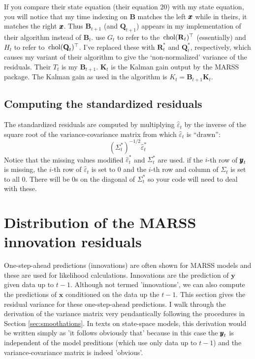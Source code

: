 \documentclass[]{article}
\def\UPS{\mbox{\boldmath $\Upsilon$}}
\def\BB{\mbox{$\mathbf B$}}	\def\bb{\mbox{$\mathbf b$}} \def\Bb{\mbox{$\mathbf J$}} \def\Ba{\mbox{$\mathbf L$}} \def\Bm{\UPS}
\def\KK{\mbox{$\mathbf K$}}
\def\QQ{\mbox{$\mathbf Q$}}	 \def\qq{\mbox{$\mathbf q$}} \def\Qb{\mbox{$\mathbf G$}}  \def\Qm{\mathbb{Q}}
\def\RR{\mbox{$\mathbf R$}}	 \def\rr{\mbox{$\mathbf r$}} \def\Rb{\mbox{$\mathbf H$}}	\def\Rm{\mathbb{R}}
\def\chol{\,\textup{\textrm{chol}}}
\begin{document}
If you compare their state equation (their equation 20) with my state equation, you will notice that my time indexing on $\BB$ matches the left $\mbox{$\pmb{x}$}$ while in theirs, it matches the right $\mbox{$\pmb{x}$}$. Thus $\BB_{t+1}$ (and $\QQ_{t+1}$) appears in my implementation of their algorithm instead of $\BB_t$.
\citet[eqns. 19, 20]{Harveyetal1998} use $G_t$ to refer to the $\chol(\RR_t)^\top$ (essentially) and $H_t$ to refer to $\chol(\QQ_t)^\top$.  I've replaced these with $\RR_t^*$ and $\QQ_t^*$, respectively, which causes my variant of their algorithm to give the `non-normalized' variance of the residuals.  Their $T_t$ is my $\BB_{t+1}$. 
$\KK_t$ is the Kalman gain output by the MARSS package.  The Kalman gain as used in the \citet{Harveyetal1998} algorithm is $K_t=\BB_{t+1}\KK_t$.

\subsection{Computing the standardized residuals}
The standardized residuals are computed by multiplying $\hat{\varepsilon}_t$ by the inverse of the square root of the variance-covariance matrix from which $\hat{\varepsilon}_t$ is ``drawn'':
\begin{equation}
(\Sigma_t^*)^{-1/2}\hat{\varepsilon}_t^*
\end{equation}
Notice that the missing values modified $\hat{\varepsilon}_t^*$ and $\Sigma_t^*$ are used. if the $i$-th row of $\mbox{$\pmb{y}$}_t$ is missing, the $i$-th row of $\hat{\varepsilon}_t$ is set to 0 and the $i$-th row and column of $\Sigma_t$ is set to all 0.
There will be 0s on the diagonal of $\Sigma_t^*$ so your code will need to deal with these.

\section{Distribution of the MARSS innovation residuals}

One-step-ahead predictions (innovations) are often shown for MARSS models and these are used for likelihood calculations. Innovations are the prediction of $\mathbf{y}$ given data up to $t-1$. Although not termed 'innovations', we can also compute the predictions of $\mathbf{x}$ conditioned on the data up the $t-1$. This section gives the residual variance for these one-step-ahead predictions. I walk through the derivation of the variance matrix very pendantically following the procedures in Section \ref{sec:smoothations}. In texts on state-space models, this derivation would be written simply as 'it follows obviously that' because in this case the $\mbox{$\pmb{y}$}_t$ is independent of the model preditions (which use only data up to $t-1$) and the variance-covariance matrix is indeed 'obvious'.
\end{document}
